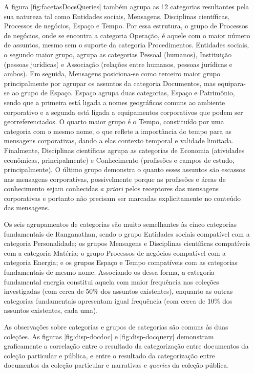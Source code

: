 A figura \ref{fig:facetasDocsQueries} também agrupa as 12 categorias resultantes pela sua natureza tal como Entidades sociais, Mensagens, Disciplinas científicas, Processos de negócios, Espaço e Tempo. Por essa estrutura, o grupo de Processos de negócios, onde se encontra a categoria Operação, é aquele com o maior número de assuntos, mesmo sem o suporte da categoria Procedimentos. Entidades sociais, o segundo maior grupo, agrupa as categorias Pessoal (humanos), Instituição (pessoas jurídicas) e Associação (relações entre humanos, pessoas jurídicas e ambos). Em seguida, Mensagens posiciona-se como terceiro maior grupo principalmente por agrupar os assuntos da categoria Documentos, mas equipara-se ao grupo de Espaço. Espaço agrupa duas categorias, Espaço e Patrimônio, sendo que a primeira está ligada a nomes geográficos comuns ao ambiente corporativo e a segunda está ligada a equipamentos corporativos que podem ser georreferenciados. O quarto maior grupo é o Tempo, constituído por uma categoria com o mesmo nome, o que reflete a importância do tempo para as mensagens corporativas, dando a elas contexto temporal e validade limitada. Finalmente, Disciplinas científicas agrupa as categorias de Economia (atividades econômicas, principalmente) e Conhecimento (profissões e campos de estudo, principalmente). O último grupo demonstra o quanto esses assuntos são escassos nas mensagens corporativas, possivelmente porque as profissões e áreas de conhecimento sejam conhecidas \textit{a priori} pelos receptores das mensagens corporativas e portanto não precisam ser marcadas explicitamente no conteúdo das mensagens.

Os seis agrupamentos de categorias são muito semelhantes às cinco categorias fundamentais de Ranganathan, sendo o grupo Entidades sociais compatível com a categoria Personalidade; os grupos Mensagens e Disciplinas científicas compatíveis com a categoria Matéria; o grupo Processos de negócios compatível com a categoria Energia; e os grupos Espaço e Tempo compatíveis com as categorias fundamentais de mesmo nome. Associando-os dessa forma, a categoria fundamental energia constitui aquela com maior frequência nas coleções investigadas (com cerca de 50\% dos assuntos existentes), enquanto as outras categorias fundamentais apresentam igual frequência (com cerca de 10\% dos assuntos existentes, cada uma). 

As observações sobre categorias e grupos de categorias são comuns às duas coleções. As figuras \ref{fig:disp-docdoc} e \ref{fig:disp-docquery} demonstram graficamente a correlação entre o resultado da categorização entre documentos da coleção particular e pública, e entre o resultado da categorização entre documentos da coleção particular e narrativas e \textit{queries} da coleção pública. %

